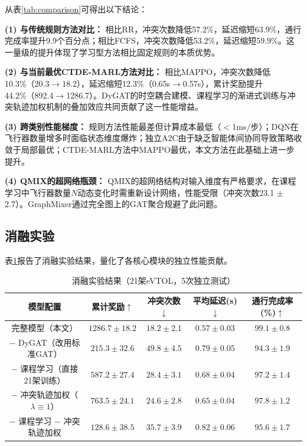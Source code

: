 \documentclass[12pt,a4paper,UTF8]{ctexart}
\begin{document}
从表\ref{tab:comparison}可得出以下结论：

\textbf{(1) 与传统规则方法对比：} 相比RR，冲突次数降低57.2\%，延迟缩短63.9\%，通行完成率提升9.9个百分点；相比FCFS，冲突次数降低53.2\%，延迟缩短59.9\%。这一量级的提升体现了学习型方法相比固定规则的本质优势。

\textbf{(2) 与当前最优CTDE-MARL方法对比：} 相比MAPPO，冲突次数降低10.3\%（20.3$\to$18.2），延迟缩短12.3\%（0.65s$\to$0.57s），累计奖励提升44.2\%（892.4$\to$1286.7）。DyGAT的时空耦合建模、课程学习的渐进式训练与冲突轨迹加权机制的叠加效应共同贡献了这一性能增益。

\textbf{(3) 跨类别性能梯度：} 规则方法性能最差但计算成本最低（$<$1ms/步）；DQN在飞行器数量增多时面临状态维度爆炸；独立A2C由于缺乏智能体间协同导致策略收敛于局部最优；CTDE-MARL方法中MAPPO最优，本文方法在此基础上进一步提升。

\textbf{(4) QMIX的超网络瓶颈：} QMIX的超网络结构对输入维度有严格要求，在课程学习中飞行器数量$N$动态变化时需重新设计网络，性能受限（冲突次数23.1 $\pm$ 2.7）。GraphMixer通过完全图上的GAT聚合规避了此问题。

\subsection{消融实验}

表\ref{tab:ablation}报告了消融实验结果，量化了各核心模块的独立性能贡献。

\begin{table}[H]
    \centering
    \caption{消融实验结果（21架eVTOL，5次独立测试）}
    \label{tab:ablation}
    \begin{tabular}{|c|c|c|c|c|}
        \hline
        \textbf{模型配置} & \textbf{累计奖励$\uparrow$} & \textbf{冲突次数$\downarrow$} & \textbf{平均延迟(s)$\downarrow$} & \textbf{通行完成率(\%)$\uparrow$} \\
        \hline
        完整模型（本文） & $\mathbf{1286.7 \pm 18.2}$ & $\mathbf{18.2 \pm 2.1}$ & $\mathbf{0.57 \pm 0.03}$ & $\mathbf{99.1 \pm 0.8}$ \\
        $-$ DyGAT（改用标准GAT） & $215.3 \pm 32.6$ & $49.8 \pm 4.5$ & $0.79 \pm 0.05$ & $94.3 \pm 1.9$ \\
        $-$ 课程学习（直接21架训练） & $587.2 \pm 27.4$ & $28.4 \pm 3.1$ & $0.68 \pm 0.04$ & $97.2 \pm 1.4$ \\
        $-$ 冲突轨迹加权（$\lambda\equiv1$） & $763.5 \pm 24.1$ & $24.6 \pm 2.8$ & $0.65 \pm 0.04$ & $97.8 \pm 1.2$ \\
        $-$ 课程学习 $-$ 冲突轨迹加权 & $128.6 \pm 38.5$ & $35.7 \pm 3.9$ & $0.82 \pm 0.06$ & $95.6 \pm 1.7$ \\
        \hline
    \end{tabular}
\end{table}
\end{document}
